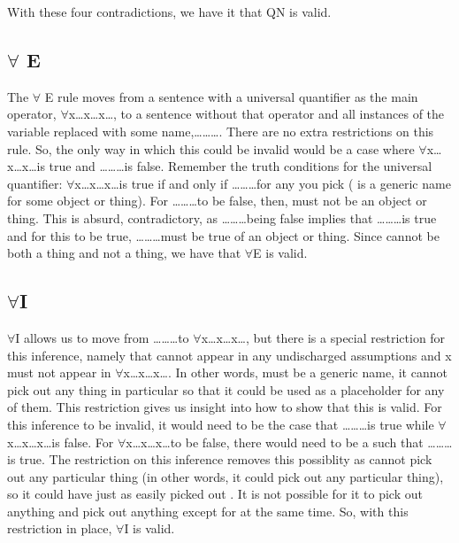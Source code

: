 With these four contradictions, we have it that QN is valid. 

\subsection{$\forall$ E}
The $\forall$ E rule moves from a sentence with a universal quantifier as the main operator, $\forall$x\ldots x\ldots x\ldots, to a sentence without that operator and all instances of the variable replaced with some name,\ldots{}\ldots{}\ldots. There are no extra restrictions on this rule. So, the only way in which this could be invalid would be a case where $\forall$x\ldots x\ldots x\ldots is true and \ldots{}\ldots{}\ldots is false. Remember the truth conditions for the universal quantifier: $\forall$x\ldots x\ldots x\ldots is true if and only if \ldots{}\ldots{}\ldots for any  you pick ( is a generic name for some object or thing). For \ldots{}\ldots{}\ldots to be false, then,  must not be an object or thing. This is absurd, contradictory, as \ldots{}\ldots{}\ldots being false implies that \enot{}\ldots{}\ldots{}\ldots is true and for this to be true, \enot{}\ldots{}\ldots{}\ldots  must be true of an object or thing. Since  cannot be both a thing and not a thing, we have that $\forall$E is valid. 

\subsection{$\forall$I}
$\forall$I allows us to move from \ldots{}\ldots{}\ldots to $\forall$x\ldots x\ldots x\ldots, but there is a special restriction for this inference, namely that  cannot appear in any undischarged assumptions and x must not appear in  $\forall$x\ldots x\ldots x\ldots. In other words,  must be a generic name, it cannot pick out any thing in particular so that it could be used as a placeholder for any of them. This restriction gives us insight into how to show that this is valid. For this inference to be invalid, it would need to be the case that \ldots{}\ldots{}\ldots is true while $\forall$x\ldots x\ldots x\ldots is false. For $\forall$x\ldots x\ldots x\ldots to be false, there would need to be a  such that \enot{}\ldots {}\ldots {}\ldots is true. The restriction on this inference removes this possiblity as  cannot pick out any particular thing (in other words, it could pick out any particular thing), so it could have just as easily picked out . It is not possible for it to pick out anything and pick out anything except for  at the same time. So, with this restriction in place, $\forall$I is valid. 

